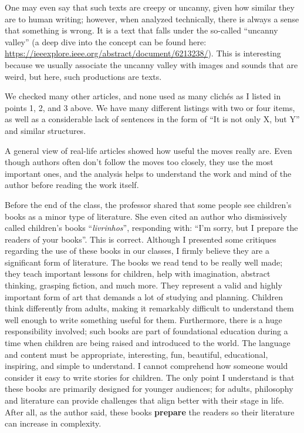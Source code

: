 One may even say that such texts are creepy or uncanny, given how similar they are to human writing; however, when analyzed technically, there is always a sense that something is wrong. It is a text that falls under the so-called ``uncanny valley'' (a deep dive into the concept can be found here: \url{https://ieeexplore.ieee.org/abstract/document/6213238/}). This is interesting because we usually associate the uncanny valley with images and sounds that are weird, but here, such productions are texts.

We checked many other articles, and none used as many clichés as I listed in points 1, 2, and 3 above. We have many different listings with two or four items, as well as a considerable lack of sentences in the form of ``It is not only X, but Y'' and similar structures.

A general view of real-life articles showed how useful the moves really are. Even though authors often don't follow the moves too closely, they use the most important ones, and the analysis helps to understand the work and mind of the author before reading the work itself.

Before the end of the class, the professor shared that some people see children's books as a minor type of literature. She even cited an author who dismissively called children's books ``\textit{livrinhos}'', responding with: ``I'm sorry, but I prepare the readers of your books''. This is correct. Although I presented some critiques regarding the use of these books in our classes, I firmly believe they are a significant form of literature. The books we read tend to be really well made; they teach important lessons for children, help with imagination, abstract thinking, grasping fiction, and much more. They represent a valid and highly important form of art that demands a lot of studying and planning. Children think differently from adults, making it remarkably difficult to understand them well enough to write something useful for them. Furthermore, there is a huge responsibility involved; such books are part of foundational education during a time when children are being raised and introduced to the world. The language and content must be appropriate, interesting, fun, beautiful, educational, inspiring, and simple to understand. I cannot comprehend how someone would consider it easy to write stories for children. The only point I understand is that these books are primarily designed for younger audiences; for adults, philosophy and literature can provide challenges that align better with their stage in life. After all, as the author said, these books \textbf{prepare} the readers so their literature can increase in complexity.

